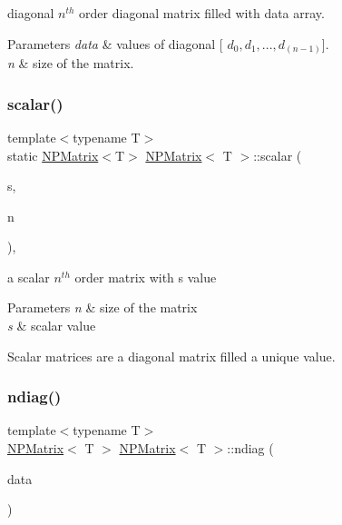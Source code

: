 diagonal $ n^{th} $ order diagonal matrix filled with data array. 


\begin{DoxyParams}{Parameters}
{\em data} & values of diagonal {\ttfamily \mbox{[}} $ d_0, d_1, ..., d_{(n-1)} ${\ttfamily \mbox{]}}. \\
\hline
{\em n} & size of the matrix. \\
\hline
\end{DoxyParams}
\mbox{\label{class_n_p_matrix_a3195b8dd4a279c3018122c3053997f8c}} 
\subsubsection{\texorpdfstring{scalar()}{scalar()}}
{\footnotesize\ttfamily template$<$typename T$>$ \\
static \mbox{\hyperlink{class_n_p_matrix}{N\+P\+Matrix}}$<$T$>$ \mbox{\hyperlink{class_n_p_matrix}{N\+P\+Matrix}}$<$ T $>$\+::scalar (\begin{DoxyParamCaption}\item[{T}]{s,  }\item[{\mbox{\hyperlink{typedef_8h_a1b140a2034db3f5dfe18a987745df43a}{ul\+\_\+t}}}]{n }\end{DoxyParamCaption})\hspace{0.3cm}{\ttfamily [inline]}, {\ttfamily [static]}}



a scalar $ n^{th} $ order matrix with {\ttfamily s} value 


\begin{DoxyParams}{Parameters}
{\em n} & size of the matrix \\
\hline
{\em s} & scalar value\\
\hline
\end{DoxyParams}
Scalar matrices are a diagonal matrix filled a unique value. \mbox{\label{class_n_p_matrix_a16aa6a18c33005300049ab1a39cbfbc2}} 
\subsubsection{\texorpdfstring{ndiag()}{ndiag()}}
{\footnotesize\ttfamily template$<$typename T$>$ \\
\mbox{\hyperlink{class_n_p_matrix}{N\+P\+Matrix}}$<$ T $>$ \mbox{\hyperlink{class_n_p_matrix}{N\+P\+Matrix}}$<$ T $>$\+::ndiag (\begin{DoxyParamCaption}\item[{const std\+::vector$<$ \mbox{\hyperlink{class_n_vector}{N\+Vector}}$<$ T $>$ $>$ \&}]{data }\end{DoxyParamCaption})\hspace{0.3cm}{\ttfamily [static]}}



